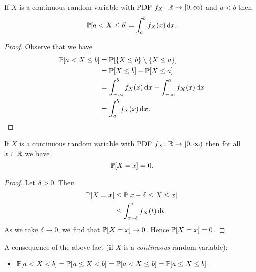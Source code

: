 \documentclass[class=article, crop=false]{standalone}
\begin{document}
  \phantom{}
  \begin{theorem}{}
    If $X$ is a continuous random variable with PDF $f_X\colon \R\to [0, \infty)$ and $a < b$ then
    \[
      \P[a < X \leq b] = \int_{a}^{b}f_X(x) \,\mathrm dx.
    \]
    \begin{proof}
      Observe that we have
      \begin{align*}
        \P[a < X \leq b] &= \P[\set{X \leq b}\sm \set{X \leq a}] \\
                         &= \P[X \leq b] - \P[X \leq a] \\
                         &= \int_{-\infty}^{b}f_X(x) \,\mathrm dx - \int_{-\infty}^{a}f_X(x) \,\mathrm dx \\
                         &= \int_{a}^{b}f_X(x) \,\mathrm dx.
      \end{align*}
    \end{proof}
  \end{theorem}
  \begin{theorem}{}
    If $X$ is a continuous random variable with PDF $f_X\colon \R\to [0, \infty)$ then for all $x\in\R$ we have
    \[
      \P[X = x] = 0.
    \]
    \begin{proof}
      Let $\delta > 0$. Then
      \begin{align*}
        \P[X = x] &\leq \P[x - \delta \leq X \leq x] \\
                  &\leq \int_{x - \delta}^{x}f_X(t) \,\mathrm dt.
      \end{align*}
      As we take $\delta \to 0$, we find that $\P[X = x]\to 0$. Hence $\P[X = x] = 0$.
    \end{proof}
  \end{theorem}
  A consequence of the above fact (if $X$ is a \emph{continuous} random variable):
  \begin{itemize}
    \item $\P[a < X < b] = \P[a \leq X < b] = \P[a < X \leq b] = \P[a \leq X \leq b]$.
  \end{itemize}
\end{document}
